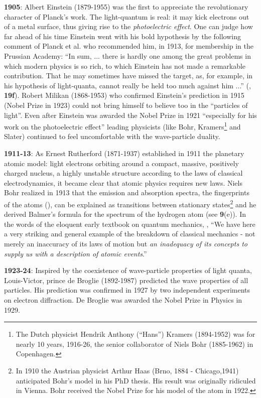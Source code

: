 \documentclass[12pt]{article}
\begin{document}
{\bf 1905}: Albert Einstein (1879-1955) was the first to appreciate the
revolutionary character of Planck's work. The light-quantum is real: it may
kick electrons out of a metal surface, thus giving rise to the {\it photoelectric
effect}. One can judge how far ahead of his time Einstein went with his bold
hypothesis by the following comment of Planck et al. who recommended him, in
1913, for membership in the Prussian Academy: ``In sum, ... there is hardly
one among the great problems in which modern physics is so rich, to which
Einstein has not made a remarkable contribution. That he may sometimes have
missed the target, as, for example, in his hypothesis of light-quanta, cannot
really be held too much against him ...'' (\cite{P}, {\bf 19f}). Robert Milikan
 (1868-1953) who confirmed Einstein's prediction in 1915 (Nobel Prize in 1923)
could not bring himself to believe too in the ``particles of light''. Even after
 Einstein was awarded the Nobel Prize in 1921 ``especially for his work on the
photoelectric effect'' leading physicists (like Bohr, Kramers\footnote{The Dutch
physicist Hendrik Anthony (``Hans'') Kramers (1894-1952) was for nearly 10
years, 1916-26, the senior collaborator of Niels Bohr (1885-1962) in Copenhagen.} 
and Slater) continued to feel uncomfortable with the wave-particle duality.

{\bf 1911-13}: As Ernest Rutherford (1871-1937) established in 1911 the
planetary atomic model: light electrons orbiting around a compact, massive,
positively charged nucleus, a highly unstable structure according to the laws
of classical electrodynamics, it became clear that atomic physics requires new
laws. Niels Bohr realized in 1913 that the emission and absorption spectra,
the fingerprints of the atoms (\cite{B05}), can be explained as transitions
between stationary states\footnote{In 1910 the Austrian physicist Arthur Haas
(Brno, 1884 - Chicago,1941) anticipated Bohr's model in his PhD thesis. His
result was originally ridiculed in Vienna. Bohr received the Nobel Prize for 
his model of the atom in 1922.} and he derived Balmer's formula for
 the spectrum of the hydrogen atom (see \cite{P86} {\bf 9}(e)). In the 
 words of the eloquent early textbook on quantum mechanics, \cite{D30}, 
 ``We have here a very striking and general example of the breakdown
 of classical mechanics - not merely an inaccuracy of its laws of motion but
{\it an inadequacy of its concepts to supply us with a description of atomic
events}.'' 

{\bf 1923-24}: Inspired by the coexistence of wave-particle properties of light
quanta, Louis-Victor, prince de Broglie (1892-1987) predicted the wave
properties of all particles. His prediction was confirmed in 1927 by two
independent experiments on electron diffraction. De Broglie was awarded the
Nobel Prize in Physics in 1929.
\end{document}
